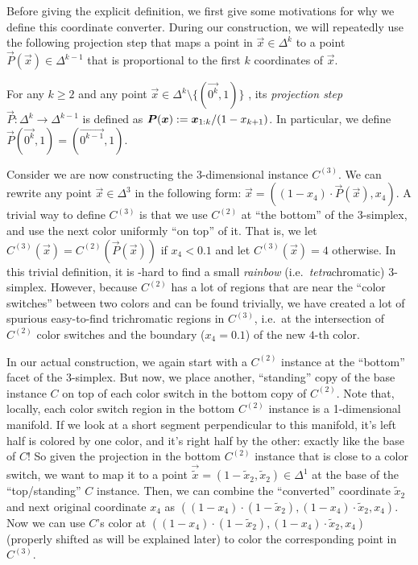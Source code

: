 Before giving the explicit definition, we first give some motivations for why we define this coordinate converter. 
During our construction, we will repeatedly use the following projection step that maps a point in $\vec{x}\in \Delta^{k}$ to a point $\vec{P}(\vec{x}) \in \Delta^{k-1}$ that is proportional to the first $k$ coordinates of $\vec{x}$.
\begin{definition} 
    \label{def:projection}
    For any $k\geq 2$ and any point $\vec{x}\in \Delta^k\setminus \{(\vec{0^k},1)\}$
    , its {\em projection step} $\vec{P}: \Delta^k \rightarrow \Delta^{k-1}$ is defined as $\boldsymbol{P}(\boldsymbol{x}) := \boldsymbol{x}_{1:k}/(1-x_{k+1})$. 
    In particular, we define $\vec{P}(\vec{0^k},1)=(\vec{0^{k-1}},1)$.
\end{definition}
Consider we are now constructing the $3$-dimensional instance $C^{(3)}$.
We can rewrite any point $\vec{x}\in \Delta^3$ in the following form: $\vec{x}=((1-x_4)\cdot \vec{P}(\vec{x}),x_4)$. 
A trivial way to define $C^{(3)}$ is that we use $C^{(2)}$ at ``the bottom'' of the $3$-simplex, and use the next color uniformly ``on top'' of it.
That is, 
we let $C^{(3)}(\vec{x})=C^{(2)}(\vec{P}(\vec{x}))$ if $x_4<0.1$ and let $C^{(3)}(\vec{x})= 4$ otherwise. 
In this trivial definition, it is \PPAD-hard to find a small {\em rainbow} (i.e.~{\em tetra}chromatic) $3$-simplex.
However, because $C^{(2)}$ has a lot of regions that are near the ``color switches'' between two colors and can be found trivially, we have created a lot of spurious easy-to-find trichromatic regions in $C^{(3)}$, i.e.~at the intersection of $C^{(2)}$ color switches and the boundary ($x_4=0.1$) of the new $4$-th color. 

In our actual construction, we again start with a $C^{(2)}$ instance at the ``bottom'' facet of the $3$-simplex. But now, we place another, ``standing'' copy of the base instance $C$ on top of each color switch in the bottom copy of $C^{(2)}$.
Note that, locally, each color switch region in the bottom  $C^{(2)}$ instance is a 1-dimensional manifold.
If we look at a short segment perpendicular to this manifold, it's left half is colored by one color, and it's right half by the other: exactly like the base of $C$! 
So given the projection in the bottom $C^{(2)}$ instance that is close to a color switch, we want to map it to a point $\vec{\tilde{x}}=(1-\tilde{x}_2, \tilde{x}_2)\in \Delta^1$ at the base of the ``top/standing'' $C$ instance. 
Then, we can combine the ``converted'' coordinate $\tilde{x}_2$ and next original coordinate $x_4$ as $((1-x_4)\cdot (1-\tilde{x}_2), (1-x_4)\cdot \tilde{x}_2, x_4)$. Now we can use $C$'s color at $((1-x_4)\cdot (1-\tilde{x}_2), (1-x_4)\cdot \tilde{x}_2, x_4)$ (properly shifted as will be explained later) to color the corresponding point in $C^{(3)}$.


